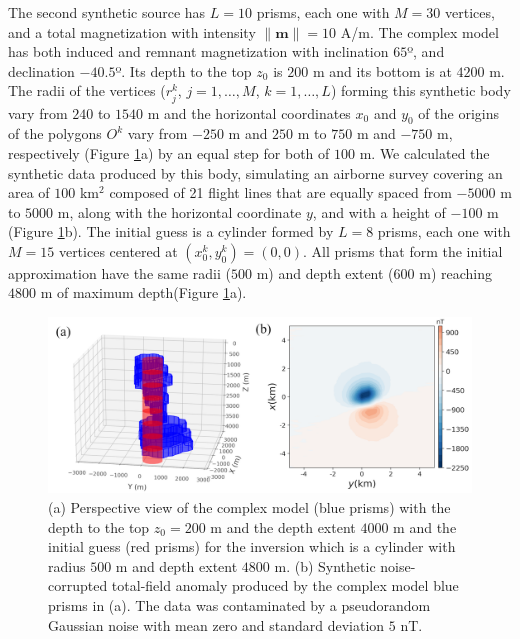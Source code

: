 \documentclass[extra,mreferee]{gji}
\begin{document}
The second synthetic source has $L=10$ prisms, each one with $M=30$ vertices, and a total magnetization with intensity $\|\mathbf{m}\| =10$ A/m. The complex model has both induced and remnant magnetization with inclination $65$º, and declination $-40.5$º. Its depth to the top $z_0$ is $200$ m and its bottom is at $4200$ m. The radii of the vertices ($r_j^k$, $j=1,\dots,M$, $k=1,\dots,L$) forming this synthetic body vary from $240$ to $1540$ m and the horizontal coordinates $x_0$ and $y_0$ of the origins of the polygons $O^k$ vary from $-250$ m and $250$ m to $750$ m and $-750$ m, respectively (Figure \ref{fig:complex_model}a) by an equal step for both of $100$ m. We calculated the synthetic data produced by this body, simulating an airborne survey covering an area of $100$ km$^2$ composed of 21 flight lines that are equally spaced from $-5000$ m to $5000$ m, along with the horizontal coordinate $y$, and with a height of $-100$ m (Figure \ref{fig:complex_model}b). The initial guess is a cylinder formed by $L=8$ prisms, each one with $M=15$ vertices centered at $(x_0^k, y_0^k) = (0,0)$. All prisms that form the initial approximation have the same radii ($500$ m) and depth extent ($600$ m) reaching $4800$ m of maximum depth(Figure \ref{fig:complex_model}a).

\begin{figure}
    \centering
    \includegraphics[scale=.75]{figures/complex_3d_ini_data.png}
    \caption{(a) Perspective view of the complex model (blue prisms) with the depth to the top $z_0 = 200$ m and the depth extent $4000$ m and the initial guess (red prisms) for the inversion which is a cylinder with radius $500$ m and depth extent $4800$ m. (b) Synthetic noise-corrupted total-field anomaly produced by the complex model blue prisms in (a). The data was contaminated by a pseudorandom Gaussian noise with mean zero and standard deviation $5$ nT.
}
    \label{fig:complex_model}
\end{figure}
\end{document}
